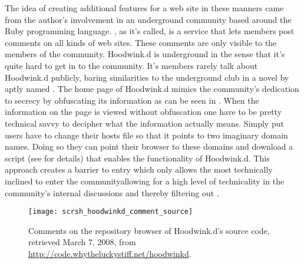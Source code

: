 The idea of creating additional features for a web site in these manners
came from the author's involvement in an underground community based around
the Ruby programming language. ,%
as it's called, is a service that lets members post comments on all kinds of
web sites. These comments are only visible to the members of the
community.
Hoodwink.d is underground in the sense that it's quite hard to get in to
the community. It's members rarely talk about Hoodwink.d publicly, baring
similarities to the underground club in a novel by \citet{palahniuk96}
aptly named .%
The home page of Hoodwink.d mimics the community's dedication to secrecy
by obfuscating its information as can be seen in
.
When the information on the page is viewed without obfuscation%
one have to be pretty technical savvy to decipher what the information 
actually means. Simply put users have to change their hosts file
so that it points to two imaginary domain names. Doing so they can point their
browser to these domains and download a script (see
 for details)
that enables the functionality
of Hoodwink.d.%
This approach creates a barrier to entry which only allows the most
technically inclined to enter the community\dash{}allowing for a
high level of technicality in the community's internal discussions
and thereby filtering out .

\begin{figure}
  \begin{whole}
    \texttt{[image: scrsh\_hoodwinkd\_comment\_source]}
    \caption[Hoodwink.d Comments]{
      Comments on the repository browser of Hoodwink.d's source code,
      retrieved March 7, 2008, from
      \url{http://code.whytheluckystiff.net/hoodwinkd}.
    }
    \label{figure:scrsh.hoodwinkd.comment.source}
  \end{whole}
\end{figure}

